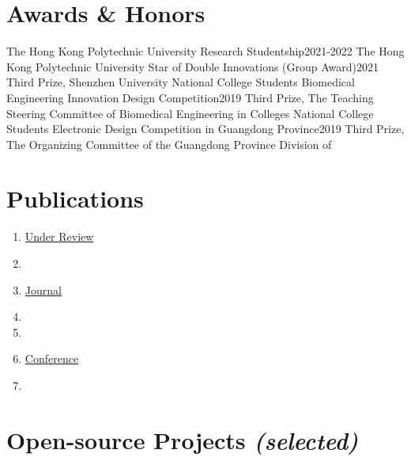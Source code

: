 \documentclass[letterpaper,11pt]{article}
\begin{document}
    \section{Awards \& Honors}

    \resumeSubHeadingListStart
        \resumeSubheading
            {The Hong Kong Polytechnic University Research Studentship}{2021-2022}
            {The Hong Kong Polytechnic University}{}
        \resumeSubheading
            {Star of Double Innovations (Group Award)}{2021}
            {Third Prize, Shenzhen University}{}
        \resumeSubheading
            {National College Students Biomedical Engineering Innovation Design Competition}{2019}
            {Third Prize, The Teaching Steering Committee of Biomedical Engineering in Colleges}{}
        \resumeSubheading
            {National College Students Electronic Design Competition in Guangdong Province}{2019}
            {Third Prize, The Organizing Committee of the Guangdong Province Division of }{}
    \resumeSubHeadingListEnd

    \section{Publications}

    

    \begin{enumerate}[leftmargin=0.15in, label={}, itemsep=0em]
        \item \underline{Under Review}
        \item {}
        
        \item \underline{Journal}
        \item {}
        \item {}
        
        \item \underline{Conference}
        \item {}
    \end{enumerate}

    \section{Open-source Projects \emph{(selected)}}
\end{document}
